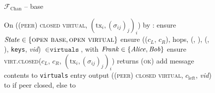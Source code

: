 \begin{figure}[H]
\begin{systembox}{$\mathcal{F}_{\mathrm{Chan}}$ -- base}
\begin{algorithmic}[1]
      \State On (\textsc{(peer) closed virtual}, $(\mathrm{tx}_i,
      (\sigma_{ij})_j)_i$) by \charlie:
      \Indent
        \State ensure $\mathit{State} \in \{\textsc{open base}, \textsc{open
        virtual}\}$
        \State ensure (($c_L$, $c_R$), hops, (\charlie, \dave), (\frank,
        \george), \texttt{keys}, \textit{vid}) $\in \texttt{virtuals}$,
        with $\mathit{Frank} \in \{\mathit{Alice}, \mathit{Bob}\}$  
        \State ensure \textsc{virt.closed}($c_L$, $c_R$, $(\mathrm{tx}_i,
        (\sigma_{ij})_j)_i$) returns (\textsc{ok})
        \State add message contents to \texttt{virtuals} entry
        \State {} output (\textsc{(peer)
        closed virtual}, $c_{\mathrm{left}}$, \textit{vid}) to \george if peer
        closed, else to \frank {}
      \EndIndent
    \end{algorithmic}
  \end{systembox}
  \caption{}
  \label{code:functionality:chan:skeleton:base}
\end{figure}

